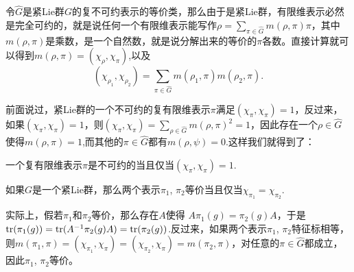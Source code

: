 令$\hat{G}$是紧Lie群$G$的复不可约表示的等价类，那么由于是紧Lie群，有限维表示必然是完全可约的，就是说任何一个有限维表示能写作$\rho=\sum_{\pi\in\hat{G}}m(\rho,\pi)\pi$，其中$m(\rho,\pi)$是乘数，是一个自然数，就是说分解出来的等价的$\pi$各数。直接计算就可以得到$m(\rho,\pi)=(\chi_\rho,\chi_\pi)$,以及
\[
	(\chi_{\rho_1},\chi_{\rho_2})=\sum_{\pi\in\hat{G}}m(\rho_1,\pi)m(\rho_2,\pi).
\]

前面说过，紧Lie群的一个不可约的复有限维表示$\pi$满足$(\chi_\pi, \chi_\pi)=1$，反过来，如果$(\chi_\pi, \chi_\pi)=1$，则$(\chi_{\pi},\chi_{\pi})=\sum_{\rho\in\hat{G}}m(\rho,\pi)^2=1$，因此存在一个$\rho\in\hat{G}$使得$m(\rho,\pi)=1$,而其他的$\pi\in\hat{G}$都有$m(\rho,\psi)=0$.这样我们就得到了：

\para 一个复有限维表示$\pi$是不可约的当且仅当$(\chi_{\pi},\chi_{\pi})=1$.

\begin{pro}
如果$G$是一个紧Lie群，那么两个表示$\pi_1$, $\pi_2$等价当且仅当$\chi_{\pi_1}=\chi_{\pi_2}$.
\end{pro}

实际上，假若$\pi_1$和$\pi_2$等价，那么存在$A$使得
$A\pi_1(g)=\pi_2(g)A$，于是$\operatorname{tr}(\pi_1(g))=\operatorname{tr}(A^{-1}\pi_2(g)A)=\operatorname{tr}(\pi_2(g))$.反过来，如果两个表示$\pi_1$, $\pi_2$特征标相等，则$	m(\pi_1,\pi)=(\chi_{\pi_1},\chi_\pi)=(\chi_{\pi_2},\chi_\pi)=m(\pi_2,\pi)$，对任意的$\pi\in\hat{G}$都成立，因此$\pi_1$, $\pi_2$等价。